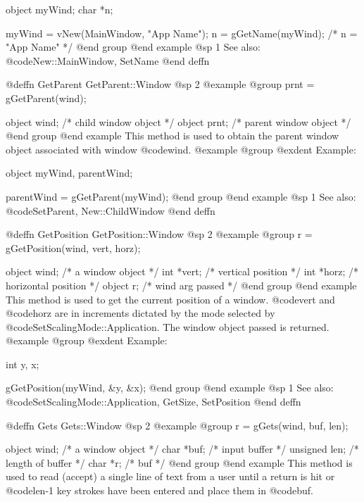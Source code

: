 object  myWind;
char    *n;

myWind = vNew(MainWindow, "App Name");
n = gGetName(myWind);   /*  n = "App Name"  */
@end group
@end example
@sp 1
See also:  @code{New::MainWindow, SetName}
@end deffn














@deffn {GetParent} GetParent::Window
@sp 2
@example
@group
prnt = gGetParent(wind);

object  wind;   /*  child window object   */
object  prnt;   /*  parent window object  */
@end group
@end example
This method is used to obtain the parent window object associated
with window @code{wind}.
@example
@group
@exdent Example:

object  myWind, parentWind;

parentWind = gGetParent(myWind);
@end group
@end example
@sp 1
See also:  @code{SetParent, New::ChildWindow}
@end deffn















@deffn {GetPosition} GetPosition::Window
@sp 2
@example
@group
r = gGetPosition(wind, vert, horz);

object  wind;   /*  a window object     */
int    *vert;   /*  vertical position   */
int    *horz;   /*  horizontal position */
object  r;      /*  wind arg passed     */
@end group
@end example
This method is used to get the current position of a window.
@code{vert} and @code{horz} are in increments dictated by the
mode selected by @code{SetScalingMode::Application}.  The window
object passed is returned.
@example
@group
@exdent Example:

int     y, x;

gGetPosition(myWind, &y, &x);
@end group
@end example
@sp 1
See also:  @code{SetScalingMode::Application, GetSize, SetPosition}
@end deffn







@deffn {Gets} Gets::Window
@sp 2
@example
@group
r = gGets(wind, buf, len);

object   wind;  /*  a window object       */
char    *buf;   /*  input buffer          */
unsigned len;   /*  length of buffer      */
char    *r;     /*  buf                   */
@end group
@end example
This method is used to read (accept) a single line of text from a user
until a return is hit or @code{len}-1 key strokes have been entered
and place them in @code{buf}.

